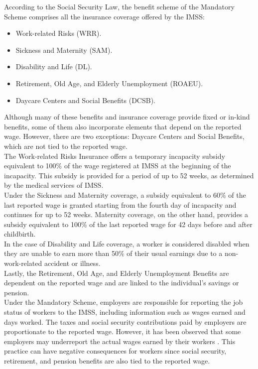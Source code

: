 \documentclass[10pt, oneside]{book}
\begin{document}
According to the Social Security Law, the benefit scheme of the Mandatory Scheme comprises all the insurance coverage offered by the IMSS:

\begin{itemize}
    \item Work-related Risks (WRR).
    \item Sickness and Maternity (SAM).
    \item Disability and Life (DL).
    \item Retirement, Old Age, and Elderly Unemployment (ROAEU).
    \item Daycare Centers and Social Benefits (DCSB). 
\end{itemize}

Although many of these benefits and insurance coverage provide fixed or in-kind benefits, some of them also incorporate elements that depend on the reported wage. However, there are two exceptions: Daycare Centers and Social Benefits, which are not tied to the reported wage. \\

The Work-related Risks Insurance offers a temporary incapacity subsidy equivalent to 100\% of the wage registered at IMSS at the beginning of the incapacity. This subsidy is provided for a period of up to 52 weeks, as determined by the medical services of IMSS. \\

Under the Sickness and Maternity coverage, a subsidy equivalent to 60\% of the last reported wage is granted starting from the fourth day of incapacity and continues for up to 52 weeks. Maternity coverage, on the other hand, provides a subsidy equivalent to 100\% of the last reported wage for 42 days before and after childbirth. \\

In the case of Disability and Life coverage, a worker is considered disabled when they are unable to earn more than 50\% of their usual earnings due to a non-work-related accident or illness. \\

Lastly, the Retirement, Old Age, and Elderly Unemployment Benefits are dependent on the reported wage and are linked to the individual's savings or pension. \\

Under the Mandatory Scheme, employers are responsible for reporting the job status of workers to the IMSS, including information such as wages earned and days worked. The taxes and social security contributions paid by employers are proportionate to the reported wage. However, it has been observed that some employers may underreport the actual wages earned by their workers \citep{kumler2020enlisting}. This practice can have negative consequences for workers since social security, retirement, and pension benefits are also tied to the reported wage. \\
\end{document}
